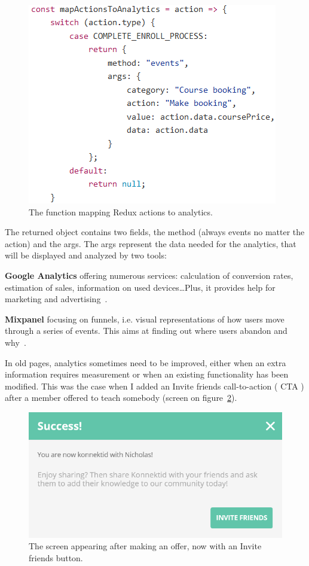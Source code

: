 \begin{figure}[H]
    \centering
    \includegraphics{figure/mapActions.png}
    \caption{The function mapping Redux actions to analytics.}
    \label{fig:mapActions}
\end{figure}

The returned object contains two fields, the method (always \guillemotleft{} events \guillemotright{} no matter the action) and the args. The args represent the data needed for the analytics, that will be displayed and analyzed by two tools:

\textbf{Google Analytics} offering numerous services: calculation of conversion rates, estimation of sales, information on used devices\ldots Plus, it provides help for marketing and advertising~\cite{googleAnalytics}.

\textbf{Mixpanel} focusing on funnels, i.e. visual representations of how users move through a series of events. This aims at finding out where users abandon and why~\cite{mixpanel}.

In old pages, analytics sometimes need to be improved, either when an extra information requires measurement or when an existing functionality has been modified. This was the case when I added an \guillemotleft{} Invite friends \guillemotright{} call-to-action (\guillemotleft{} CTA \guillemotright{}) after a member offered to teach somebody (screen on {\sc figure}~\ref{fig:afterOffer}).

\begin{figure}[H]
    \centering
    \includegraphics[scale=0.8]{figure/afterOffer.png}
    \caption{The screen appearing after making an offer, now with an \guillemotleft{} Invite friends \guillemotright{} button.}
    \label{fig:afterOffer}
\end{figure}

